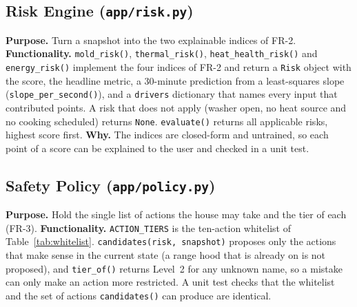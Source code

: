 \documentclass[conference]{IEEEtran}
\begin{document}
\subsection{Risk Engine (\texttt{app/risk.py})}
\textbf{Purpose.} Turn a snapshot into the two explainable indices of FR-2.
\textbf{Functionality.} \texttt{mold\_risk()}, \texttt{thermal\_risk()}, \texttt{heat\_health\_risk()} and \texttt{energy\_risk()} implement the four indices of FR-2 and return a \texttt{Risk} object with the score, the headline metric, a 30-minute prediction from a least-squares slope (\texttt{slope\_per\_second()}), and a \texttt{drivers} dictionary that names every input that contributed points. A risk that does not apply (washer open, no heat source and no cooking scheduled) returns \texttt{None}. \texttt{evaluate()} returns all applicable risks, highest score first.
\textbf{Why.} The indices are closed-form and untrained, so each point of a score can be explained to the user and checked in a unit test.

\subsection{Safety Policy (\texttt{app/policy.py})}
\textbf{Purpose.} Hold the single list of actions the house may take and the tier of each (FR-3).
\textbf{Functionality.} \texttt{ACTION\_TIERS} is the ten-action whitelist of Table~\ref{tab:whitelist}. \texttt{candidates(risk, snapshot)} proposes only the actions that make sense in the current state (a range hood that is already on is not proposed), and \texttt{tier\_of()} returns Level~2 for any unknown name, so a mistake can only make an action more restricted. A unit test checks that the whitelist and the set of actions \texttt{candidates()} can produce are identical.
\end{document}
